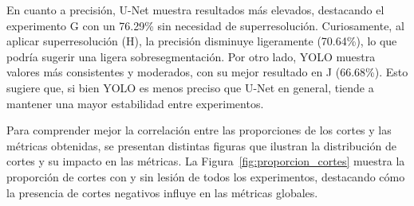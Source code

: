 \documentclass[../main.tex]{subfiles}
\begin{document}
En cuanto a precisión, U-Net muestra resultados más elevados, destacando el experimento G con un 76.29\% sin necesidad de superresolución. Curiosamente, al aplicar superresolución (H), la precisión disminuye ligeramente (70.64\%), lo que podría sugerir una ligera sobresegmentación. Por otro lado, YOLO muestra valores más consistentes y moderados, con su mejor resultado en J (66.68\%). Esto sugiere que, si bien YOLO es menos preciso que U-Net en general, tiende a mantener una mayor estabilidad entre experimentos.

Para comprender mejor la correlación entre las proporciones de los cortes y las métricas obtenidas, se presentan distintas figuras que ilustran la distribución de cortes y su impacto en las métricas. La Figura~\ref{fig:proporcion_cortes} muestra la proporción de cortes con y sin lesión de todos los experimentos, destacando cómo la presencia de cortes negativos influye en las métricas globales.
\end{document}
